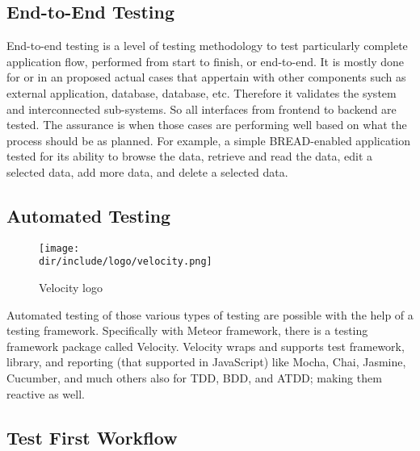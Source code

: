 \subsection{End-to-End Testing}

End-to-end testing is a level of testing methodology to test particularly complete application flow, performed from start to finish, or end-to-end.
It is mostly done for or in an proposed actual cases that appertain with other components such as external application, database, database, etc.
Therefore it validates the system and interconnected sub-systems.
So all interfaces from frontend to backend are tested.
The assurance is when those cases are performing well based on what the process should be as planned.
For example, a simple \ac{BREAD}-enabled application tested for its ability to browse the data, retrieve and read the data, edit a selected data, add more data, and delete a selected data.

\subsection{Automated Testing}

\begin{wrapfigure}{r}{0.5\textwidth}
  \vspace{-20pt}
  \begin{center}
    \texttt{[image: \\dir/include/logo/velocity.png]}
  \end{center}
  \vspace{-20pt}
  \caption{Velocity logo}
  \label{fig:velocity-logo}
  \vspace{-10pt}
\end{wrapfigure}

Automated testing of those various types of testing are possible with the help of a testing framework.
Specifically with Meteor framework, there is a testing framework package called Velocity.
Velocity wraps and supports test framework, library, and reporting (that supported in JavaScript) like Mocha, Chai, Jasmine, Cucumber, and much others also for \ac{TDD}, \ac{BDD}, and \ac{ATDD}; making them reactive as well.

\subsection{Test First Workflow}

